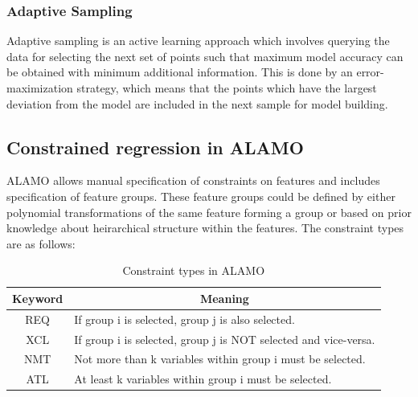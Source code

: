 \documentclass[a4paper,12pt]{article}
\begin{document}
\subsubsection{Adaptive Sampling}
Adaptive sampling is an active learning \cite{angluin1988queries,settles.tr09} approach which involves querying the data for selecting the next set of points such that maximum model accuracy can be obtained with minimum additional information. This is done by an error-maximization strategy, which means that the points which have the largest deviation from the model are included in the next sample for model building. 
\subsection{Constrained regression in ALAMO}
ALAMO allows manual specification of constraints on features and includes specification of feature groups. These feature groups could be defined by either polynomial transformations of the same feature forming a group or based on prior knowledge about heirarchical structure within the features. The constraint types are as follows:
\begin{table}[H]
\centering
\begin{tabular}{|c|l|}
\hline
\textbf{Keyword} & \multicolumn{1}{c|}{\textbf{Meaning}}                           \\ \hline
REQ              & If group i is selected, group j is also selected.               \\ \hline
XCL              & If group i is selected, group j is NOT selected and vice-versa. \\ \hline
NMT              & Not more than k variables within group i must be selected.      \\ \hline
ATL              & At least k variables within group i must be selected.           \\ \hline
\end{tabular}
\caption{Constraint types in ALAMO}
 
\end{table}

\newpage
\end{document}
